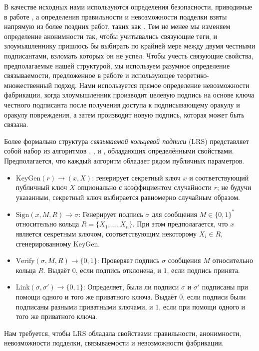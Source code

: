 \documentclass{article}
\theoremstyle{definition}
\begin{document}
В качестве исходных нами используются определения безопасности, приводимые в работе \cite{groth}, а определения правильности и невозможности подделки взяты напрямую из более поздних работ, таких как \cite{backes}.
Тем не менее мы изменяем определение анонимности так, чтобы учитывались связующие теги, и злоумышленнику пришлось бы выбирать по крайней мере между двумя честными подписантами, взломать которых он не успел.
Чтобы учесть связующие свойства, предполагаемые нашей структурой, мы используем разумное определение связываемости, предложенное в работе \cite{backes} и использующее теоретико-множественный подход. Нами используется прямое определение невозможности фабрикации, когда злоумышленник производит целевую подпись на основе ключа честного подписанта после получения доступа к подписывающему оракулу и оракулу повреждения, а затем производит новую подпись, которая может быть связана.

Более формально структура \textit{связываемой кольцевой подписи} (LRS) представляет собой набор из алгоритмов , ,  и , обладающих определёнными свойствами.
Предполагается, что каждый алгоритм обладает рядом публичных параметров.
\begin{itemize}
\item $\text{KeyGen}(r) \to (x,X)$: генерирует секретный ключ $x$ и соответствующий публичный ключ $X$ опционально с коэффициентом случайности $r$; не будучи указанным, секретный ключ выбирается равномерно случайным образом.
\item $\text{Sign}(x,M,R) \to \sigma$: Генерирует подпись $\sigma$ для сообщения $M \in \{0,1\}^*$ относительно кольца $R = \{X_1,\ldots,X_n\}$. При этом предполагается, что $x$ является секретным ключом, соответствующим некоторому $X_i \in R$, сгенерированному $\text{KeyGen}$.
\item $\text{Verify}(\sigma,M,R) \to \{0,1\}$: Проверяет подпись $\sigma$ сообщения $M$ относительно кольца $R$.
Выдаёт $0$, если подпись отклонена, и $1$, если подпись принята.
\item $\text{Link}(\sigma,\sigma') \to \{0,1\}$: Определяет, были ли подписи $\sigma$ и $\sigma'$ подписаны при помощи одного и того же приватного ключа.
Выдаёт $0$, если подписи были подписаны разными приватными ключами, и $1$, если при помощи одного и того же приватного ключа.
\end{itemize}

Нам требуется, чтобы LRS обладала свойствами правильности, анонимности, невозможности подделки, связываемости и невозможности фабрикации.
\end{document}
